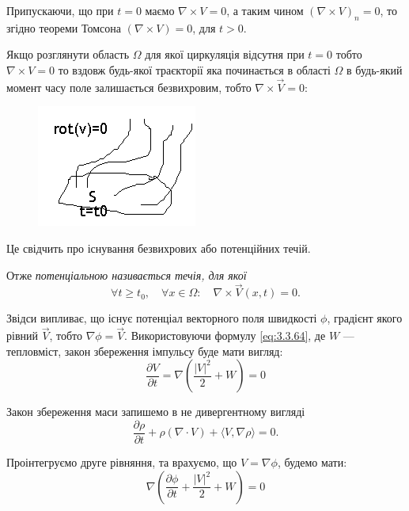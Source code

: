 Припускаючи, що при $t = 0$ маємо $\nabla \times V = 0$, а таким чином $(\nabla \times V)_n = 0$, то згідно теореми Томсона $(\nabla \times V) = 0$, для $t > 0$. \medskip

Якщо розглянути область $\Omega$ для якої циркуляція відсутня при $t = 0$ тобто $\nabla \times V = 0$ то вздовж будь-якої траєкторії яка починається в області $\Omega$ в будь-який момент часу поле залишається безвихровим, тобто $\nabla \times \vec V = 0$:
\begin{figure}[H]
	\centering
	\includegraphics[]{img/11-5.png}
\end{figure}

Це свідчить про існування безвихрових або потенційних течій. \medskip

\begin{definition}
	Отже \it{потенціальною} називається течія, для якої
	\begin{equation}
		\forall t \ge t_0, \quad \forall x \in \Omega: \quad \nabla \times \vec V(x, t) = 0.
	\end{equation}
\end{definition}

Звідси випливає, що існує потенціал векторного поля швидкості $\phi$, градієнт якого рівний $\vec V$, тобто $\nabla \phi = \vec V$. Використовуючи формулу \eqref{eq:3.3.64}, де $W$ --- тепловміст, закон збереження імпульсу буде мати вигляд:
\begin{equation}
	\frac{\partial V}{\partial t} = \nabla \left( \frac{|V|^2}{2} + W \right) = 0
\end{equation}

Закон збереження маси запишемо в не дивергентному вигляді
\begin{equation}
	\frac{\partial \rho}{\partial t} + \rho (\nabla \cdot V) + \langle V, \nabla \rho \rangle = 0.
\end{equation}

Проінтегруємо друге рівняння, та врахуємо, що $V = \nabla \phi$, будемо мати:
\begin{equation}
	\nabla \left( \frac{\partial \phi}{\partial t} + \frac{|V|^2}{2} + W \right) = 0
\end{equation}

